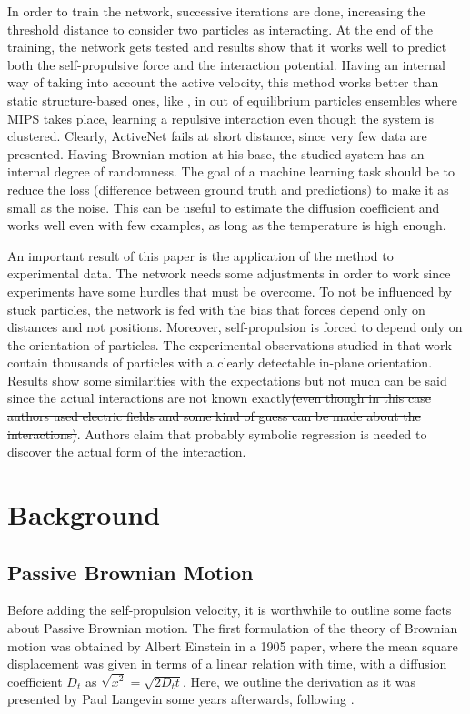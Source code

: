 \documentclass[../../master_thesis_np.tex]{subfiles}
\begin{document}
	In order to train the network, successive iterations are done, increasing the threshold distance to consider two particles as interacting. 
	At the end of the training, the network gets tested and results show that it works well to predict both the self-propulsive force and the interaction potential. 
	Having an internal way of taking into account the active velocity, this method works better than static structure-based ones, like \cite{bag_interaction_2021}, in out of equilibrium particles ensembles where MIPS takes place, learning a repulsive interaction even though the system is clustered. 
	Clearly, ActiveNet fails at short distance, since very few data are presented. 
	Having Brownian motion at his base, the studied system has an internal degree of randomness. 
	The goal of a machine learning task should be to reduce the loss (difference between ground truth and predictions) to make it as small as the noise. 
	This can be useful to estimate the diffusion coefficient and works well even with few examples, as long as the temperature is high enough. 
	
	An important result of this paper is the application of the method to experimental data. 
	The network needs some adjustments in order to work since experiments have some hurdles that must be overcome. 
	To not be influenced by stuck particles, the network is fed with the bias that forces depend only on distances and not positions. 
	Moreover, self-propulsion is forced to depend only on the orientation of particles. 
	The experimental observations studied in that work contain thousands of particles with a clearly detectable in-plane orientation. 
	Results show some similarities with the expectations but not much can be said since the actual interactions are not known exactly\sout{(even though in this case authors used electric fields and some kind of guess can be made about the interactions)}. 
	Authors claim that probably symbolic regression is needed to discover the actual form of the interaction.
	
	\section{Background}
	\subsection{Passive Brownian Motion}

	Before adding the self-propulsion velocity, it is worthwhile to outline some facts about Passive Brownian motion. The first formulation of the theory of Brownian motion was obtained by Albert Einstein in a 1905 paper, where the mean square displacement was given in terms of a linear relation with time, with a diffusion coefficient $D_t$ as $\sqrt{\bar{x}^2} = \sqrt{2D_t t}$. Here, we outline the derivation as it was presented by Paul Langevin some years afterwards, following \cite{gardiner_handbook_2004}.
	
\end{document}
